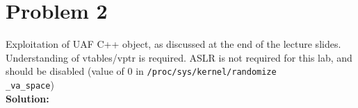 \documentclass[11pt]{article}
\newcommand\tab[1][0.5cm]{\hspace*{#1}}
\begin{document}
\section{Problem 2}
\tab Exploitation of UAF C++ object, as discussed at the end of the lecture slides. Understanding of vtables/vptr is required. ASLR is not required for this lab, and should be disabled (value of 0 in \texttt{/proc/sys/kernel/randomize}\\ \texttt{\_va\_space})
\textbf{\\Solution:\\} 
\tab 
\end{document}

